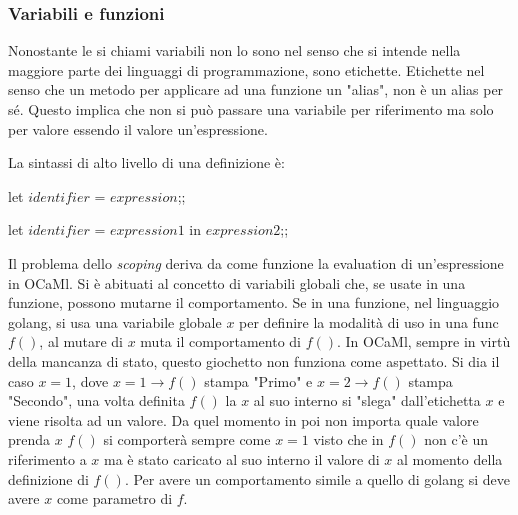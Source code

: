 \documentclass{article}
\begin{document}
\subsubsection{Variabili e funzioni}

\hspace*{0.5cm}Nonostante le si chiami variabili non lo sono nel senso che si intende nella maggiore parte dei linguaggi di programmazione, sono etichette. 
Etichette nel senso che un metodo per applicare ad una funzione un "alias", non è un alias per sé.
Questo implica che non si può passare una variabile per riferimento ma solo per valore essendo il valore un'espressione.

\vspace*{0.5cm}

\hspace*{0.5cm}La sintassi di alto livello di una definizione è: 

\hspace*{7.65cm}let $identifier$ = $expression$;;

\hspace*{7.65cm}let $identifier$ = $expression1$ in $expression2$;;


\vspace*{0.5cm}

\hspace*{0.5cm} Il problema dello \textit{scoping} deriva da come funzione la evaluation di un'espressione in OCaMl.
Si è abituati al concetto di variabili globali che, se usate in una funzione, possono mutarne il comportamento.
Se in una funzione, nel linguaggio golang, si usa una variabile globale $x$ per definire la modalità di uso in una func $f()$, al mutare di $x$ muta il comportamento di $f()$.\newline
\hspace*{0.5cm}In OCaMl, sempre in virtù della mancanza di stato, questo giochetto non funziona come aspettato.
Si dia il caso $x=1$, dove $x=1 \to f()$ stampa "Primo" e $x=2 \to f()$ stampa "Secondo", una volta definita $f()$ la $x$ al suo interno si "slega" dall'etichetta $x$ e viene risolta ad un valore.
Da quel momento in poi non importa quale valore prenda $x$ $f()$ si comporterà sempre come $x=1$ visto che in $f()$ non c'è un riferimento a $x$ ma è stato caricato al suo interno il valore di $x$ al momento della definizione di $f()$.\newline
\hspace*{0.5cm}Per avere un comportamento simile a quello di golang si deve avere $x$ come parametro di $f$.
\end{document}
